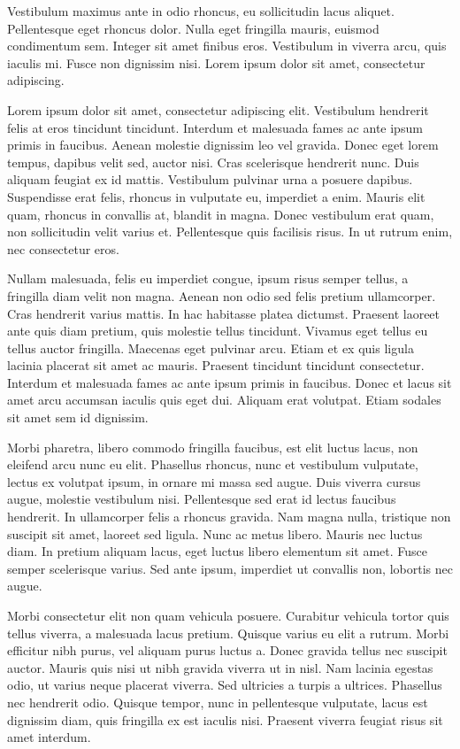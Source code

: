 Vestibulum maximus ante in odio rhoncus, eu sollicitudin lacus aliquet. Pellentesque eget rhoncus dolor. Nulla eget fringilla mauris, euismod condimentum sem. Integer sit amet finibus eros. Vestibulum in viverra arcu, quis iaculis mi. Fusce non dignissim nisi. Lorem ipsum dolor sit amet, consectetur adipiscing. 



Lorem ipsum dolor sit amet, consectetur adipiscing elit. Vestibulum hendrerit felis at eros tincidunt tincidunt. Interdum et malesuada fames ac ante ipsum primis in faucibus. Aenean molestie dignissim leo vel gravida. Donec eget lorem tempus, dapibus velit sed, auctor nisi. Cras scelerisque hendrerit nunc. Duis aliquam feugiat ex id mattis. Vestibulum pulvinar urna a posuere dapibus. Suspendisse erat felis, rhoncus in vulputate eu, imperdiet a enim. Mauris elit quam, rhoncus in convallis at, blandit in magna. Donec vestibulum erat quam, non sollicitudin velit varius et. Pellentesque quis facilisis risus. In ut rutrum enim, nec consectetur eros.

Nullam malesuada, felis eu imperdiet congue, ipsum risus semper tellus, a fringilla diam velit non magna. Aenean non odio sed felis pretium ullamcorper. Cras hendrerit varius mattis. In hac habitasse platea dictumst. Praesent laoreet ante quis diam pretium, quis molestie tellus tincidunt. Vivamus eget tellus eu tellus auctor fringilla. Maecenas eget pulvinar arcu. Etiam et ex quis ligula lacinia placerat sit amet ac mauris. Praesent tincidunt tincidunt consectetur. Interdum et malesuada fames ac ante ipsum primis in faucibus. Donec et lacus sit amet arcu accumsan iaculis quis eget dui. Aliquam erat volutpat. Etiam sodales sit amet sem id dignissim.

Morbi pharetra, libero commodo fringilla faucibus, est elit luctus lacus, non eleifend arcu nunc eu elit. Phasellus rhoncus, nunc et vestibulum vulputate, lectus ex volutpat ipsum, in ornare mi massa sed augue. Duis viverra cursus augue, molestie vestibulum nisi. Pellentesque sed erat id lectus faucibus hendrerit. In ullamcorper felis a rhoncus gravida. Nam magna nulla, tristique non suscipit sit amet, laoreet sed ligula. Nunc ac metus libero. Mauris nec luctus diam. In pretium aliquam lacus, eget luctus libero elementum sit amet. Fusce semper scelerisque varius. Sed ante ipsum, imperdiet ut convallis non, lobortis nec augue.

Morbi consectetur elit non quam vehicula posuere. Curabitur vehicula tortor quis tellus viverra, a malesuada lacus pretium. Quisque varius eu elit a rutrum. Morbi efficitur nibh purus, vel aliquam purus luctus a. Donec gravida tellus nec suscipit auctor. Mauris quis nisi ut nibh gravida viverra ut in nisl. Nam lacinia egestas odio, ut varius neque placerat viverra. Sed ultricies a turpis a ultrices. Phasellus nec hendrerit odio. Quisque tempor, nunc in pellentesque vulputate, lacus est dignissim diam, quis fringilla ex est iaculis nisi. Praesent viverra feugiat risus sit amet interdum.

